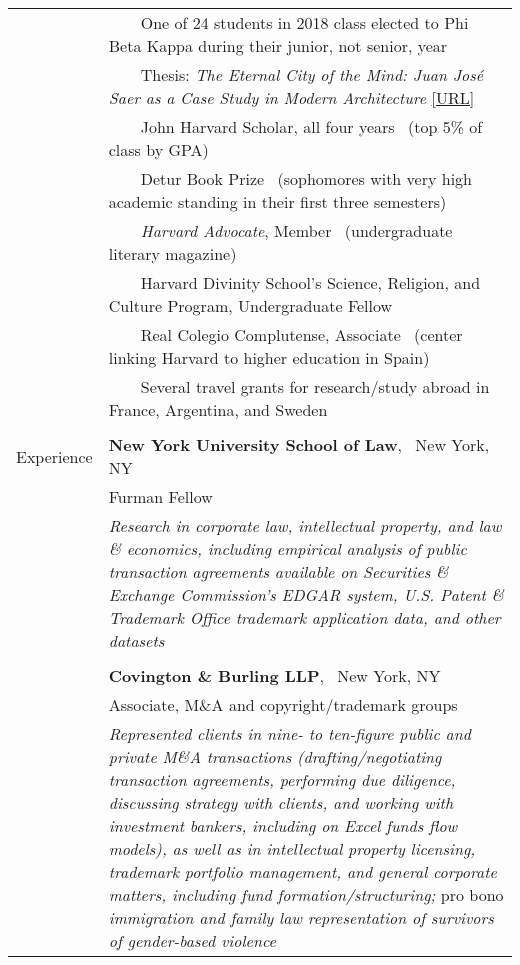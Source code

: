 \documentclass[a4paper,11pt,oneside]{article}
\newcommand{\years}[1]{\marginnote{\scriptsize #1}}
\newcommand{\tabitem}{~~\llap{\footnotesize{\textbullet}}~~}
\newcommand{\raum}{\vspace{1.5ex}}
\begin{document}
\begin{tabular}{@{} l l}
     & \tabitem One of 24 students in 2018 class elected to Phi Beta Kappa during their junior, not senior, year \\
     & \tabitem Thesis: \textit{The Eternal City of the Mind: Juan José Saer as a Case Study in Modern Architecture} \href{https://github.com/4casas/thesis}{[URL]} \\
     & \tabitem John Harvard Scholar, all four years \ (top 5\% of class by GPA) \\
     & \tabitem Detur Book Prize \ (sophomores with very high academic standing in their first three semesters) \\
     & \tabitem \textit{Harvard Advocate}, Member \ (undergraduate literary magazine) \\
     & \tabitem Harvard Divinity School’s Science, Religion, and Culture Program, Undergraduate Fellow \\
     & \tabitem Real Colegio Complutense, Associate \ (center linking Harvard to higher education in Spain) \\
     & \tabitem Several travel grants for research/study abroad in France, Argentina, and Sweden \\
     & \\
\large{Experience} & \small{\textbf{New York University School of Law}}, \ New York, NY \raum \\
    & \years{2024—} Furman Fellow \raum \\
    & \parbox{5.0in}{\textit{Research in corporate law, intellectual property, and law \& economics, including empirical analysis of public transaction agreements available on Securities \& Exchange Commission's EDGAR system, U.S. Patent \& Trademark Office trademark application data, and other datasets}} \\
    & \\
    & \small{\textbf{Covington \& Burling LLP}}, \ New York, NY \raum \\
    & \years{2021—2024} Associate, M\&A and copyright/trademark groups \raum \\
    & \parbox{5.0in}{\textit{Represented clients in nine- to ten-figure public and private M\&A transactions (drafting/negotiating transaction agreements, performing due diligence, discussing strategy with clients, and working with investment bankers, including on Excel funds flow models), as well as in intellectual property licensing, trademark portfolio management, and general corporate matters, including fund formation/structuring;} pro bono \textit{immigration and family law representation of survivors of gender-based violence}} \raum \\

\end{tabular}
\end{document}
